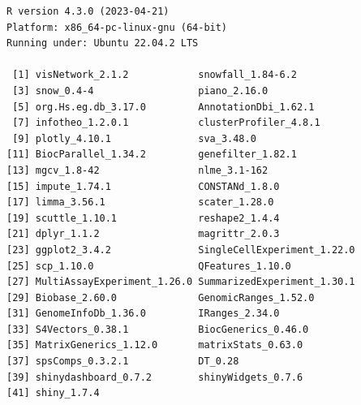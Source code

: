 \documentclass[
  11pt,
]{article}
\begin{document}
\begin{verbatim}
R version 4.3.0 (2023-04-21)
Platform: x86_64-pc-linux-gnu (64-bit)
Running under: Ubuntu 22.04.2 LTS

 [1] visNetwork_2.1.2            snowfall_1.84-6.2          
 [3] snow_0.4-4                  piano_2.16.0               
 [5] org.Hs.eg.db_3.17.0         AnnotationDbi_1.62.1       
 [7] infotheo_1.2.0.1            clusterProfiler_4.8.1      
 [9] plotly_4.10.1               sva_3.48.0                 
[11] BiocParallel_1.34.2         genefilter_1.82.1          
[13] mgcv_1.8-42                 nlme_3.1-162               
[15] impute_1.74.1               CONSTANd_1.8.0             
[17] limma_3.56.1                scater_1.28.0              
[19] scuttle_1.10.1              reshape2_1.4.4             
[21] dplyr_1.1.2                 magrittr_2.0.3             
[23] ggplot2_3.4.2               SingleCellExperiment_1.22.0
[25] scp_1.10.0                  QFeatures_1.10.0           
[27] MultiAssayExperiment_1.26.0 SummarizedExperiment_1.30.1
[29] Biobase_2.60.0              GenomicRanges_1.52.0       
[31] GenomeInfoDb_1.36.0         IRanges_2.34.0             
[33] S4Vectors_0.38.1            BiocGenerics_0.46.0        
[35] MatrixGenerics_1.12.0       matrixStats_0.63.0         
[37] spsComps_0.3.2.1            DT_0.28                    
[39] shinydashboard_0.7.2        shinyWidgets_0.7.6         
[41] shiny_1.7.4                
\end{verbatim}

\newpage
\listoffigures
\end{document}
